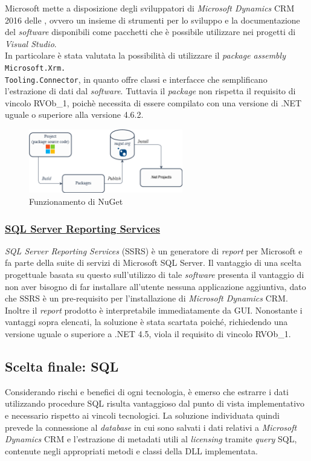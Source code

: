 Microsoft mette a disposizione degli sviluppatori di \emph{Microsoft Dynamics} CRM 2016 delle , ovvero un insieme di strumenti per lo sviluppo e la documentazione del \emph{software} disponibili come pacchetti  che è possibile utilizzare nei progetti di \emph{Visual Studio}. 
\\
In particolare è stata valutata la possibilità di utilizzare il \emph{package assembly} \texttt{Microsoft.Xrm.} \\ \texttt{Tooling.Connector}, in quanto offre classi e interfacce che semplificano l'estrazione di dati dal \emph{software}.
Tuttavia il \emph{package} non rispetta il requisito di vincolo RVOb\_1, poichè necessita di essere compilato con una versione di .NET uguale o superiore alla versione 4.6.2.
\begin{figure}[H]
\centering
\captionsetup{justification=centering,margin=2cm}
\includegraphics[width=0.6\textwidth ]{figures/sdk.png}
\caption [Funzionamento di NuGet]{Funzionamento di NuGet \label{fig:skknuget}}
\end{figure}

\subsubsection{\underline{SQL Server Reporting Services}}
\emph{SQL Server Reporting Services} (SSRS) è un generatore di \emph{report} per Microsoft e fa parte della suite di servizi di Microsoft SQL Server.
Il vantaggio di una scelta progettuale basata su questo sull'utilizzo di tale \emph{software} presenta il vantaggio di non aver bisogno di far installare all'utente nessuna applicazione aggiuntiva, dato che SSRS è un pre-requisito per l'installazione di \emph{Microsoft Dynamics} CRM. Inoltre il \emph{report} prodotto è interpretabile immediatamente da GUI.
Nonostante i vantaggi sopra elencati, la soluzione è stata scartata poiché, richiedendo una versione uguale o superiore a .NET 4.5, viola il requisito di vincolo RVOb\_1.
\subsection{Scelta finale: SQL}
Considerando rischi e benefici di ogni tecnologia, è emerso che estrarre i dati utilizzando procedure SQL risulta vantaggioso dal punto di vista implementativo e necessario rispetto ai vincoli tecnologici. 
La soluzione individuata quindi prevede la connessione al \emph{database} in cui sono salvati i dati relativi a \emph{Microsoft Dynamics} CRM e l'estrazione di metadati utili al \emph{licensing} tramite \emph{query} SQL, contenute negli appropriati metodi e classi della DLL implementata. \cite{microsoft-nuget}

